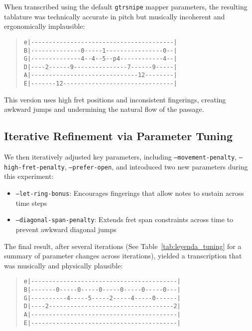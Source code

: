 \documentclass[conference]{IEEEtran}
\begin{document}
When transcribed using the default \texttt{gtrsnipe} mapper parameters, the resulting tablature was technically accurate in pitch but musically incoherent and ergonomically implausible:

\begin{quote}\small
\begin{verbatim}
e|----------------------------------------|
B|--------------0-----1----------------0--|
G|--------------4--4--5--p4------------4--|
D|----2------9---------------7------9-----|
A|------------------------------12--------|
E|-------12-------------------------------|
\end{verbatim}
\end{quote}

This version uses high fret positions and inconsistent fingerings, creating awkward jumps and undermining the natural flow of the passage.

\subsection{Iterative Refinement via Parameter Tuning}

We then iteratively adjusted key parameters, including \texttt{--movement-penalty}, \texttt{--high-fret-penalty}, \texttt{--prefer-open}, and introduced two new parameters during this experiment:

\begin{itemize}
  \item \texttt{--let-ring-bonus}: Encourages fingerings that allow notes to sustain across time steps
  \item \texttt{--diagonal-span-penalty}: Extends fret span constraints across time to prevent awkward diagonal jumps
\end{itemize}

The final result, after several iterations (See Table~\ref{tab:leyenda_tuning} for a summary of parameter changes across iterations), yielded a transcription that was musically and physically plausible:


\begin{quote}\small
\begin{verbatim}
e|-----------------------------------------|
B|-------0-----0-----0-----0-----0-----0---|
G|----------4-----5-----2-----4-----0------|
D|----2-----------------------------------2|
A|-----------------------------------------|
E|-----------------------------------------|
\end{verbatim}
\end{quote}
\end{document}
